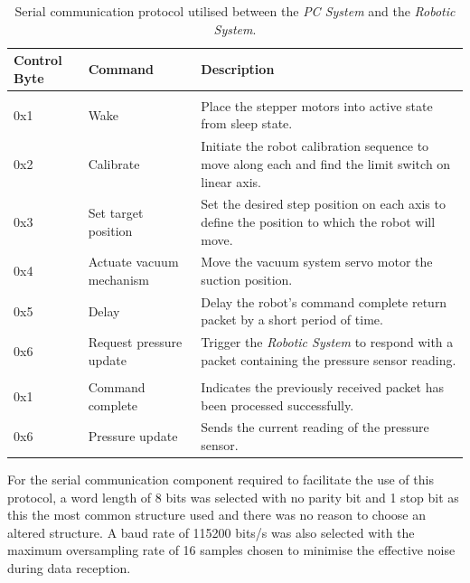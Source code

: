 \begin{table}[!ht]
	\renewcommand{\arraystretch}{1.3}
	\centering
	\begin{tabular}{|>{\raggedright}m{1.5cm}|>{\raggedright}m{3cm}|>{\raggedright\arraybackslash}m{10cm}|}
		\hline
		\textbf{Control Byte} & \textbf{Command} & \textbf{Description} \\
		\hline
		\multicolumn{3}{|l|}{\textbf{\textit{PC System} to \textit{Robotic System}}} \\
		\hline
		0x1 & Wake & Place the stepper motors into active state from sleep state. \\
		\hline
		0x2 & Calibrate & Initiate the robot calibration sequence to move along each and find the limit switch on linear axis. \\
		\hline
		0x3 & Set target position & Set the desired step position on each axis to define the position to which the robot will move. \\
		\hline
		0x4 & Actuate vacuum mechanism & Move the vacuum system servo motor the suction position. \\
		\hline
		0x5 & Delay & Delay the robot's command complete return packet by a short period of time. \\
		\hline
		0x6 & Request pressure update & Trigger the \textit{Robotic System} to respond with a packet containing the pressure sensor reading. \\
		\hline
		\multicolumn{3}{|l|}{\textbf{\textit{Robotic System} to \textit{PC System}}} \\
		\hline
		0x1 & Command complete & Indicates the previously received packet has been processed successfully. \\
		\hline
		0x6 & Pressure update & Sends the current reading of the pressure sensor. \\
		\hline
	\end{tabular}
	\caption{\label{tab:serial-communication-protocol}Serial communication protocol utilised between the \textit{PC System} and the \textit{Robotic System}.}
\end{table}

For the serial communication component required to facilitate the use of this protocol, a word length of 8 bits was selected with no parity bit and 1 stop bit as this the most common structure used and there was no reason to choose an altered structure. A baud rate of 115200 bits/s was also selected with the maximum oversampling rate of 16 samples chosen to minimise the effective noise during data reception. 



